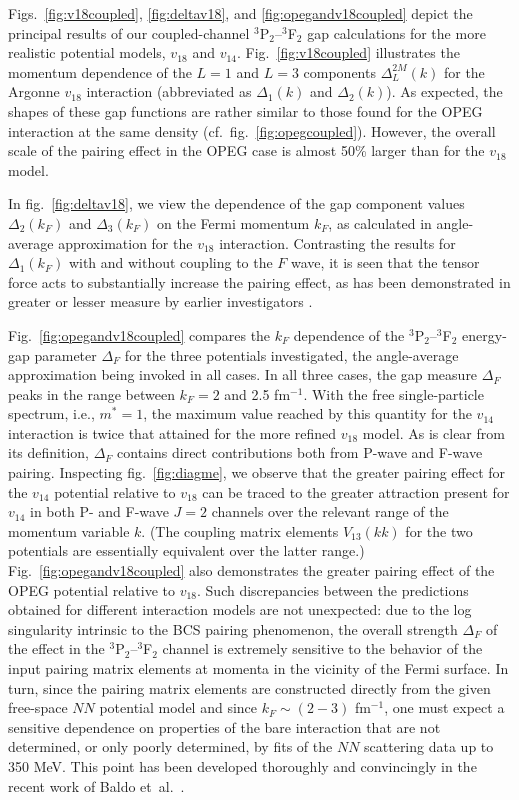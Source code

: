 Figs.~\ref{fig:v18coupled}, \ref{fig:deltav18}, and 
\ref{fig:opegandv18coupled} depict the
principal results of our coupled-channel $^3$P$_2$--$^3$F$_2$ 
gap calculations for the more realistic potential models,
$v_{18}$ and $v_{14}$.  Fig.~\ref{fig:v18coupled} illustrates the momentum 
dependence of the $L=1$ and $L=3$ components $\Delta_L^{2M}(k)$ for the
Argonne $v_{18}$ interaction (abbreviated as $\Delta_1(k)$ and
$\Delta_2(k)$).  As expected, the shapes of these gap 
functions are rather similar to those found for the OPEG interaction
at the same density (cf.~fig.~\ref{fig:opegcoupled}).  However, the
overall scale of the pairing effect in the OPEG case is almost
50\% larger than for the $v_{18}$ model.

In fig.~\ref{fig:deltav18}, we view the dependence of the gap 
component values $\Delta_2(k_F)$ and $\Delta_3(k_F)$ 
on the Fermi momentum $k_F$, as calculated in angle-average approximation 
for the $v_{18}$ interaction.  Contrasting the results for 
$\Delta_1(k_F)$ with and without coupling to the $F$ wave, 
it is seen that the tensor force acts to substantially increase the 
pairing effect, as has been demonstrated in greater or lesser
measure by earlier investigators \cite{t72,ttr,ostgaard,elgaroy}.

Fig.~\ref{fig:opegandv18coupled} compares the $k_F$ dependence
of the $^3$P$_2$--$^3$F$_2$ energy-gap parameter $\Delta_F$ for 
the three potentials investigated, the angle-average approximation 
being invoked in all cases.  In all three cases, the gap measure 
$\Delta_F$ peaks in the range between $k_F=2$ and 2.5 fm$^{-1}$.  With
the free single-particle spectrum, i.e., $m^*=1$, the maximum value 
reached by this quantity for the $v_{14}$ interaction is twice 
that attained for the more refined $v_{18}$ model.  As is clear
from its definition, $\Delta_F$ contains direct contributions both from 
P-wave and F-wave pairing.  Inspecting fig.~\ref{fig:diagme}, we
observe that the greater pairing effect for the $v_{14}$ potential 
relative to $v_{18}$ can be traced to the greater attraction present 
for $v_{14}$ in both P- and F-wave $J=2$ channels over the relevant 
range of the momentum variable $k$.  (The coupling matrix elements
$V_{13}(kk)$ for the two potentials are essentially equivalent 
over the latter range.)  Fig.~\ref{fig:opegandv18coupled} also 
demonstrates the greater pairing effect of the OPEG potential 
relative to $v_{18}$.   Such discrepancies between the predictions
obtained for different interaction models are not unexpected:  due  
to the log singularity intrinsic to the BCS pairing phenomenon,
the overall strength $\Delta_F$ of the effect in the $^3$P$_2$--$^3$F$_2$
channel is extremely sensitive to the behavior of the input pairing 
matrix elements at momenta in the vicinity of the Fermi surface.  In 
turn, since the pairing matrix elements are constructed directly
from the given free-space $NN$ potential model and since 
$k_F \sim (2-3)$ fm$^{-1}$, one must expect a sensitive dependence on 
properties of the bare interaction that are not determined, or 
only poorly determined, by fits of the $NN$ scattering data 
up to 350 MeV.  This point has been developed thoroughly and 
convincingly in the recent work of Baldo et~al.~\cite{catoslo}.


